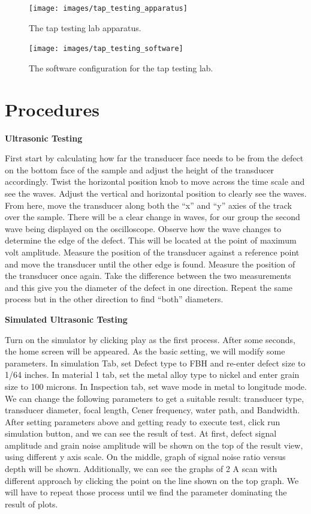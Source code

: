 \documentclass[12 pt]{report}
\begin{document}
\begin{figure}[htbp]
	\centering
	\texttt{[image: images/tap\_testing\_apparatus]}
	\caption{The tap testing lab apparatus.}
	\label{fig:tap_testing_apparatus}
\end{figure}

\begin{figure}[htbp]
	\centering
	\texttt{[image: images/tap\_testing\_software]}
	\caption{The software configuration for the tap testing lab.}
	\label{fig:tap_testing_software}
\end{figure}

\section{Procedures} \label{procedures}
\textbf{Ultrasonic Testing}

First start by calculating how far the transducer face needs to be from the defect on the bottom face of the sample and adjust the height of the transducer accordingly. Twist the horizontal position knob to move across the time scale and see the waves. Adjust the vertical and horizontal position to clearly see the waves. From here, move the transducer along both the “x” and “y” axies of the track over the sample. There will be a clear change in waves, for our group the second wave being displayed on the oscilloscope. Observe how the wave changes to determine the edge of the defect. This will be located at the point of maximum volt amplitude. Measure the position of the transducer against a reference point and move the transducer until the other edge is found. Measure the position of the transducer once again. Take the difference between the two measurements and this give you the diameter of the defect in one direction. Repeat the same process but in the other direction to find “both” diameters.

\textbf{Simulated Ultrasonic Testing}

Turn on the simulator by clicking play as the first process. After some seconds, the home screen will be appeared. As the basic setting, we will modify some parameters. In simulation Tab, set Defect type to FBH and re-enter defect size to 1/64 inches. In material 1 tab, set the metal alloy type to nickel and enter grain size to 100 microns. In Inspection tab, set wave mode in metal to longitude mode. We can change the following parameters to get a suitable result: transducer type, transducer diameter, focal length, Cener frequency, water path, and Bandwidth. After setting parameters above and getting ready to execute test, click run simulation button, and we can see the result of test. At first, defect signal amplitude and grain noise amplitude will be shown on the top of the result view, using different y axis scale. On the middle, graph of signal noise ratio versus depth will be shown. Additionally, we can see the graphs of 2 A scan with different approach by clicking the point on the line shown on the top graph. We will have to repeat those process until we find the parameter dominating the result of plots.
\end{document}
